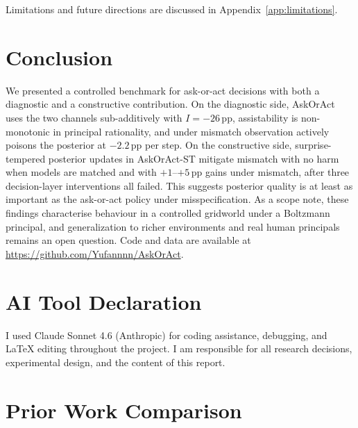 \documentclass[10pt,twocolumn]{article}
\begin{document}
Limitations and future directions are discussed in Appendix~\ref{app:limitations}.

\section{Conclusion}

We presented a controlled benchmark for ask-or-act decisions with both a diagnostic and a constructive contribution.
On the diagnostic side, AskOrAct uses the two channels sub-additively with $I{=}-26$\,pp, assistability is non-monotonic in principal rationality, and under mismatch observation actively poisons the posterior at $-2.2$\,pp per step.
On the constructive side, surprise-tempered posterior updates in AskOrAct-ST mitigate mismatch with no harm when models are matched and with $+1$--$+5$\,pp gains under mismatch, after three decision-layer interventions all failed.
This suggests posterior quality is at least as important as the ask-or-act policy under misspecification.
As a scope note, these findings characterise behaviour in a controlled gridworld under a Boltzmann principal, and generalization to richer environments and real human principals remains an open question.
Code and data are available at \url{https://github.com/Yufannnn/AskOrAct}.

\section*{AI Tool Declaration}
I used Claude Sonnet 4.6 (Anthropic) for coding assistance, debugging, and LaTeX editing throughout the project. I am responsible for all research decisions, experimental design, and the content of this report.

{\small


}

\appendix

\section{Prior Work Comparison}
\label{app:prior_work_table}
\end{document}
